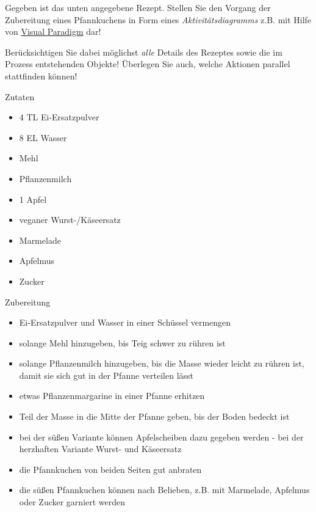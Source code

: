 \documentclass{abgabe}
\begin{document}
\begin{questions}

    Gegeben ist das unten angegebene Rezept.
    Stellen Sie den Vorgang der Zubereitung eines Pfannkuchens in Form eines \emph{Aktivitätsdiagramms} z.B. mit Hilfe von \href{https://www.ili.fh-aachen.de/ilias.php?baseClass=ilLinkResourceHandlerGUI&ref_id=341847&cmd=calldirectlink}{Visual Paradigm} dar!

    Berücksichtigen Sie dabei möglichst \emph{alle} Details des Rezeptes sowie die im Prozess entstehenden Objekte! Überlegen Sie auch, welche Aktionen parallel stattfinden können!

    {\large Zutaten}\footnotemark
    \begin{itemize}
        \item 4 TL Ei-Ersatzpulver
        \item 8 EL Wasser
        \item Mehl
        \item Pflanzenmilch
        \item 1 Apfel
        \item veganer Wurst-/Käseersatz
        \item Marmelade
        \item Apfelmus
        \item Zucker
    \end{itemize}

    {\large Zubereitung}
    \begin{itemize}
        \item Ei-Ersatzpulver und Wasser in einer Schüssel vermengen
        \item solange Mehl hinzugeben, bis Teig schwer zu rühren ist
        \item solange Pflanzenmilch hinzugeben, bis die Masse wieder leicht zu rühren ist, damit sie sich gut in der Pfanne verteilen lässt
        \item etwas Pflanzenmargarine in einer Pfanne erhitzen
        \item Teil der Masse in die Mitte der Pfanne geben, bis der Boden bedeckt ist
        \item bei der süßen Variante können Apfelscheiben dazu gegeben werden - bei der herzhaften Variante Wurst- und Käseersatz
        \item die Pfannkuchen von beiden Seiten gut anbraten
        \item die süßen Pfannkuchen können nach Belieben, z.B. mit Marmelade, Apfelmus oder Zucker garniert werden
    \end{itemize}


\end{questions}
\end{document}
